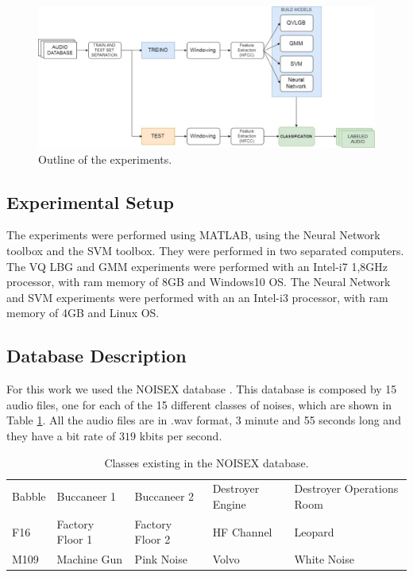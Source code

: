 \documentclass[12pt]{article}
\begin{document}
\begin{figure}[ht]
\centering
\includegraphics[width=\textwidth]{diagrama_artigo.jpg}
\caption{Outline of the experiments.}
\label{fig:exp}
\end{figure}

\subsection{Experimental Setup} \label{exp:setup}


The experiments were performed using MATLAB, using the Neural Network toolbox and the SVM toolbox. They were performed in two separated computers. The VQ LBG and GMM experiments were performed with an Intel-i7 1,8GHz processor, with ram memory of 8GB and Windows10 OS. The Neural Network and SVM experiments were performed with an an Intel-i3 processor, with ram memory of 4GB and Linux OS.

\subsection{Database Description} \label{exp:data}


For this work we used the NOISEX database \cite{varga1993assessment}. This database is composed by 15 audio files, one for each of the 15 different classes of noises, which are shown in Table \ref{tab:noisex}. All the audio files are in .wav format, 3 minute and 55 seconds long and they have a bit rate of $319$ kbits per second.

\begin{table}[ht]
	\centering
	\caption{Classes existing in the NOISEX database.}
	\label{tab:noisex}
	\begin{tabular}{lllll}
		\hline
		Babble & Buccaneer 1 & Buccaneer 2 & Destroyer Engine& Destroyer Operations Room\\
		F16 & Factory Floor 1 & Factory Floor 2 & HF Channel & Leopard\\
		M109 & Machine Gun & Pink Noise & Volvo & White Noise\\
		\hline
	\end{tabular}
\end{table}
\end{document}
